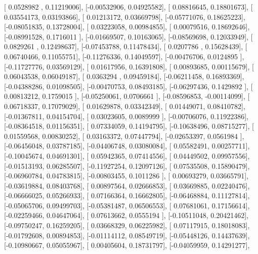 \documentclass{article}
\begin{document}
       [ 0.0528982 ,  0.11219006],
       [-0.00532906,  0.04925582],
       [ 0.08816645,  0.18801673],
       [ 0.03554173,  0.03193866],
       [ 0.01213172,  0.03669798],
       [-0.05771076,  0.18625223],
       [-0.08051835,  0.13728004],
       [ 0.03223058,  0.00984855],
       [ 0.00079516,  0.18692646],
       [-0.08991528,  0.1716011 ],
       [-0.01669507,  0.10163065],
       [-0.08569698,  0.12033949],
       [ 0.0829261 ,  0.12498637],
       [-0.07453788,  0.11478434],
       [ 0.0207786 ,  0.15628439],
       [ 0.06740466,  0.11055751],
       [-0.11276336,  0.14049597],
       [-0.00476706,  0.0124895 ],
       [-0.11727776,  0.03569129],
       [ 0.01617956,  0.16391808],
       [ 0.00893685,  0.00115679],
       [ 0.06043538,  0.06049187],
       [ 0.0363294 ,  0.09459184],
       [-0.06211458,  0.16893369],
       [-0.04388286,  0.01098505],
       [-0.00470753,  0.08493185],
       [-0.06297436,  0.1429892 ],
       [ 0.00813212,  0.1759015 ],
       [-0.05250061,  0.0706661 ],
       [-0.08596853, -0.00114099],
       [ 0.06718337,  0.17079029],
       [ 0.01629878,  0.03342349],
       [ 0.01449071,  0.08410782],
       [-0.01367811,  0.04154704],
       [ 0.03023605,  0.0089999 ],
       [-0.00706076,  0.11922386],
       [-0.08364518,  0.01156351],
       [ 0.07334059,  0.14194795],
       [-0.10638496,  0.08715277],
       [ 0.01559568,  0.00830252],
       [ 0.03163372,  0.07447794],
       [-0.02653397,  0.0561984 ],
       [-0.06456048,  0.03787185],
       [-0.04406748,  0.03080084],
       [ 0.05582491,  0.00257711],
       [-0.10045674,  0.04691301],
       [ 0.05942365,  0.07414556],
       [ 0.04449502,  0.09957556],
       [-0.01513193,  0.06285507],
       [-0.11927254,  0.12097126],
       [ 0.07535508,  0.15890479],
       [-0.06960784,  0.04783815],
       [-0.00803455,  0.1011286 ],
       [ 0.00693279,  0.03665791],
       [-0.03619884,  0.08403768],
       [ 0.00897564,  0.02666853],
       [ 0.03669885,  0.02240476],
       [-0.06666025,  0.05266933],
       [ 0.07166364,  0.16662805],
       [-0.06468884,  0.11127814],
       [-0.05065706,  0.09499703],
       [-0.05381487,  0.06506553],
       [ 0.07681061,  0.17156614],
       [-0.02259466,  0.04647064],
       [ 0.07613662,  0.0555194 ],
       [-0.10511048,  0.20421462],
       [-0.09750247,  0.16259205],
       [ 0.03668329,  0.06225982],
       [ 0.07117915,  0.18018083],
       [-0.01792608,  0.00894853],
       [-0.01114112,  0.08549719],
       [-0.05448126,  0.14437639],
       [-0.10980667,  0.05055967],
       [ 0.00405604,  0.18731797],
       [-0.04059959,  0.14291277],
\end{document}
